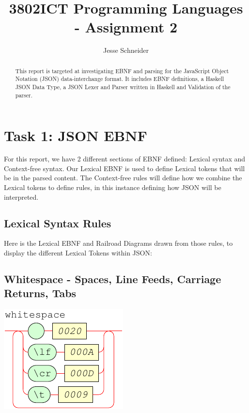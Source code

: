 \documentclass[a4paper]{article}
\begin{document}
\title{3802ICT Programming Languages - Assignment 2}


\author{Jesse Schneider}

\maketitle


\begin{abstract}
   This report is targeted at investigating EBNF and parsing for the JavaScript Object
   Notation (JSON) data-interchange format. It includes EBNF definitions, a Haskell
   JSON Data Type, a JSON Lexer and Parser written in Haskell and Validation of the
   parser.
\end{abstract}


\section{Task 1: JSON EBNF}

For this report, we have 2 different sections of EBNF defined:
Lexical syntax and Context-free syntax. Our Lexical EBNF is used to define
Lexical tokens that will be in the parsed content. The Context-free rules 
will define how we combine the Lexical tokens to define rules, in this instance
defining how JSON will be interpreted.

\subsection{Lexical Syntax Rules}

Here is the Lexical EBNF and Railroad Diagrams drawn from those rules,
to display the different Lexical Tokens within JSON:

\subsection*{Whitespace - Spaces, Line Feeds, Carriage Returns, Tabs}


{\centering

   \includegraphics[scale=0.9]{EBNF/whitespace}

}
\end{document}
